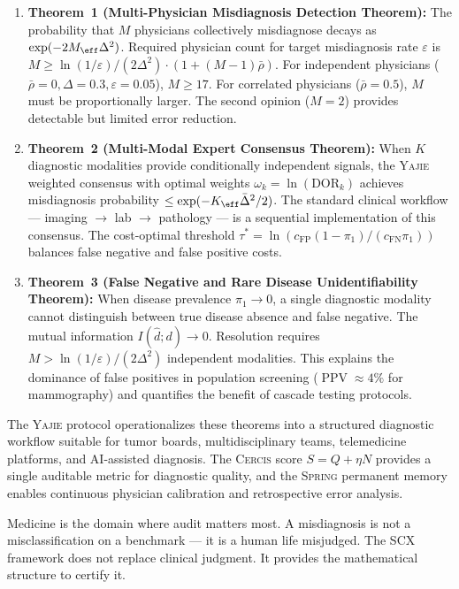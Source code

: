 \documentclass[11pt,a4paper]{article}
\theoremstyle{definition}
\newcommand{\Yajie}{\textsc{Yajie}}
\newcommand{\Spring}{\textsc{Spring}}
\newcommand{\Cercis}{\textsc{Cercis}}
\newcommand{\SCX}{\textsc{SCX}}
\DeclareMathOperator{\PPV}{PPV}
\newcommand{\disease}{d}                       %
\newcommand{\diagnosis}{\hat{d}}               %
\begin{document}
\begin{enumerate}[nosep]
    \item \textbf{Theorem~1 (Multi-Physician Misdiagnosis Detection Theorem):}
    The probability that $M$ physicians collectively misdiagnose decays
    as $\exp(-2M_{\eff}\Delta^2)$. Required physician count for target
    misdiagnosis rate $\varepsilon$ is $M \ge \ln(1/\varepsilon)/(2\Delta^2)
    \cdot (1 + (M-1)\bar{\rho})$. For independent physicians
    ($\bar{\rho}=0, \Delta=0.3, \varepsilon=0.05$), $M \ge 17$. For
    correlated physicians ($\bar{\rho}=0.5$), $M$ must be proportionally
    larger. The second opinion ($M=2$) provides detectable but limited
    error reduction.

    \item \textbf{Theorem~2 (Multi-Modal Expert Consensus Theorem):}
    When $K$ diagnostic modalities provide conditionally independent signals,
    the \Yajie{} weighted consensus with optimal weights
    $\omega_k = \ln(\text{DOR}_k)$ achieves misdiagnosis probability
    $\le \exp(-K_{\eff}\bar{\Delta}^2/2)$. The standard clinical workflow
    --- imaging $\to$ lab $\to$ pathology --- is a sequential implementation
    of this consensus. The cost-optimal threshold $\tau^* = \ln(c_{\text{FP}}
    (1-\pi_1) / (c_{\text{FN}} \pi_1))$ balances false negative and false
    positive costs.

    \item \textbf{Theorem~3 (False Negative and Rare Disease Unidentifiability Theorem):}
    When disease prevalence $\pi_1 \to 0$, a single diagnostic modality
    cannot distinguish between true disease absence and false negative.
    The mutual information $I(\diagnosis; \disease) \to 0$. Resolution
    requires $M > \ln(1/\varepsilon)/(2\Delta^2)$ independent modalities.
    This explains the dominance of false positives in population screening
    ($\PPV \approx 4\%$ for mammography) and quantifies the benefit of
    cascade testing protocols.
\end{enumerate}

The \Yajie{} protocol operationalizes these theorems into a structured
diagnostic workflow suitable for tumor boards, multidisciplinary teams,
telemedicine platforms, and AI-assisted diagnosis. The \Cercis{} score
$S = Q + \eta N$ provides a single auditable metric for diagnostic quality,
and the \Spring{} permanent memory enables continuous physician calibration
and retrospective error analysis.

Medicine is the domain where audit matters most. A misdiagnosis is not
a misclassification on a benchmark --- it is a human life misjudged. The
\SCX{} framework does not replace clinical judgment. It provides the
mathematical structure to certify it.
\end{document}
